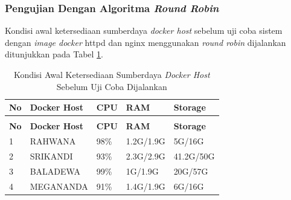 \subsubsection{Pengujian Dengan Algoritma \textit{Round Robin}}
Kondisi awal ketersediaan sumberdaya \textit{docker host} sebelum uji coba sistem dengan \textit{image docker} httpd dan nginx menggunakan \textit{round robin} dijalankan ditunjukkan pada Tabel \ref{kondisiawal2}.
\begin{longtable}{|p{}|p{}|p{}|p{}|p{}|} %

\caption{Kondisi Awal Ketersediaan Sumberdaya \textit{Docker Host} Sebelum Uji Coba Dijalankan} \label{kondisiawal2} \\
\hline
\textbf{No} & \textbf{Docker Host} & \textbf{CPU} & \textbf{RAM}  & \textbf{Storage} \\ \hline
\endfirsthead
\caption[]{Kondisi Awal Ketersediaan Sumberdaya \textit{Docker Host} Sebelum Uji Coba Dijalankan}  \\
\hline
\textbf{No} & \textbf{Docker Host} & \textbf{CPU} & \textbf{RAM} & \textbf{Storage} \\ \hline
\endhead
\endfoot
\endlastfoot

1 & RAHWANA & 98\%  & 1.2G/1.9G & 5G/16G \\ \hline
2 & SRIKANDI & 93\%  & 2.3G/2.9G & 41.2G/50G \\ \hline
3 & BALADEWA & 99\%  & 1G/1.9G & 20G/57G \\ \hline
4 & MEGANANDA & 91\%  & 1.4G/1.9G & 6G/16G \\ \hline
\end{longtable}

